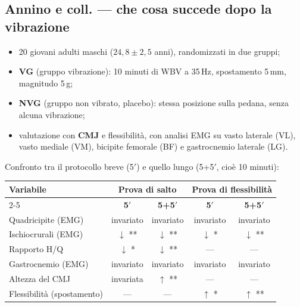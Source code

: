 \subsection{Annino e coll. --- che cosa succede dopo la vibrazione}

\begin{itemize}
  \item 20 giovani adulti maschi ($24{,}8 \pm 2{,}5$ anni), randomizzati in due gruppi;
  \item \textbf{VG} (gruppo vibrazione): 10 minuti di WBV a 35\,Hz, spostamento 5\,mm, magnitudo
    5\,g;
  \item \textbf{NVG} (gruppo non vibrato, placebo): stessa posizione sulla pedana, senza alcuna
    vibrazione;
  \item valutazione con \textbf{CMJ} e flessibilità, con analisi EMG su vasto laterale (VL), vasto
    mediale (VM), bicipite femorale (BF) e gastrocnemio laterale (LG).
\end{itemize}

Confronto tra il protocollo breve (5$'$) e quello lungo (5+5$'$, cioè 10 minuti):

\begin{table}[htbp]
  \centering
  \small
  \renewcommand{\arraystretch}{1.3}
  \begin{tabularx}{\textwidth}{|X|c|c|c|c|}
    \hline
    \multirow{2}{*}{\textbf{Variabile}} & \multicolumn{2}{c|}{\textbf{Prova di salto}} &
      \multicolumn{2}{c|}{\textbf{Prova di flessibilità}} \\
    \cline{2-5}
     & \textbf{5$'$} & \textbf{5+5$'$} & \textbf{5$'$} & \textbf{5+5$'$} \\
    \hline
    Quadricipite (EMG) & invariato & invariato & invariato & invariato \\
    \hline
    Ischiocrurali (EMG) & $\downarrow$ ** & $\downarrow$ ** & $\downarrow$ * & $\downarrow$ ** \\
    \hline
    Rapporto H/Q & $\downarrow$ * & $\downarrow$ ** & --- & --- \\
    \hline
    Gastrocnemio (EMG) & invariato & invariato & invariato & invariato \\
    \hline
    Altezza del CMJ & invariata & $\uparrow$ ** & --- & --- \\
    \hline
    Flessibilità (spostamento) & --- & --- & $\uparrow$ * & $\uparrow$ ** \\
    \hline
  \end{tabularx}
\end{table}

